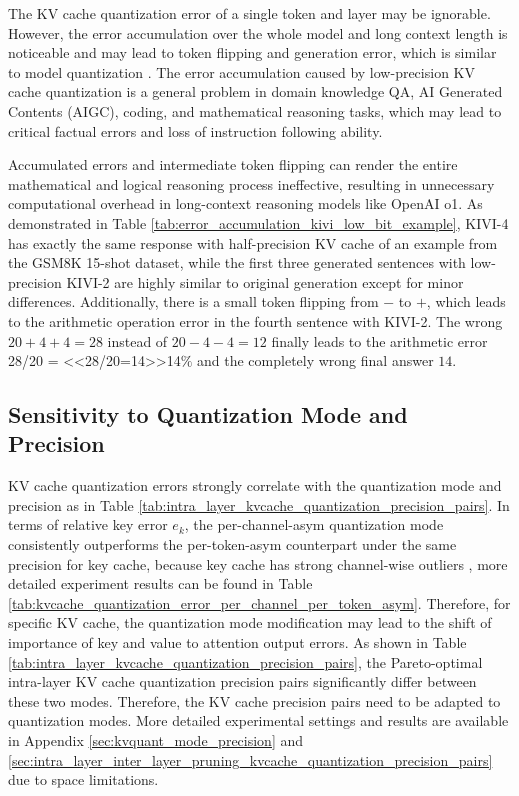 The KV cache quantization error of a single token and layer may be ignorable. However, the error accumulation over the whole model and long context length is noticeable and may lead to token flipping and generation error, which is similar to model quantization \cite{lee2024fliptoken}. The error accumulation caused by low-precision KV cache quantization is a general problem in domain knowledge QA, AI Generated Contents (AIGC), coding, and mathematical reasoning tasks, which may lead to critical factual errors and loss of instruction following ability.

Accumulated errors and intermediate token flipping can render the entire mathematical and logical reasoning process ineffective, resulting in unnecessary computational overhead in long-context reasoning models like OpenAI o1.
As demonstrated in Table \ref{tab:error_accumulation_kivi_low_bit_example}, KIVI-4 has exactly the same response with half-precision KV cache of an example from the GSM8K 15-shot dataset, while the first three generated sentences with low-precision KIVI-2 are highly similar to original generation except for minor differences. Additionally, there is a small token flipping from $-$ to $+$, which leads to the arithmetic operation error in the fourth sentence with KIVI-2. The wrong $20+4+4=28$ instead of $20-4-4=12$ finally leads to the arithmetic error 28/20 = <<28/20=14>>14$\%$ and the completely wrong final answer $14$. 


\subsection{Sensitivity to Quantization Mode and Precision}
\label{sec:kvcache_sensitivity_to_quantization_mode_precision}
KV cache quantization errors strongly correlate with the quantization mode and precision as in Table \ref{tab:intra_layer_kvcache_quantization_precision_pairs}.
In terms of relative key error $e_k$, the per-channel-asym quantization mode consistently outperforms the per-token-asym counterpart under the same precision for key cache, because key cache has strong channel-wise outliers \cite{liu2024kivi, hooper2024kvquant}, more detailed experiment results can be found in Table \ref{tab:kvcache_quantization_error_per_channel_per_token_asym}. Therefore, for specific KV cache, the quantization mode modification may lead to the shift of importance of key and value to attention output errors.
As shown in Table \ref{tab:intra_layer_kvcache_quantization_precision_pairs}, the Pareto-optimal intra-layer KV cache quantization precision pairs significantly differ between these two modes. Therefore, the KV cache precision pairs need to be adapted to quantization modes. More detailed experimental settings and results are available in Appendix \ref{sec:kvquant_mode_precision} and \ref{sec:intra_layer_inter_layer_pruning_kvcache_quantization_precision_pairs} due to space limitations.

